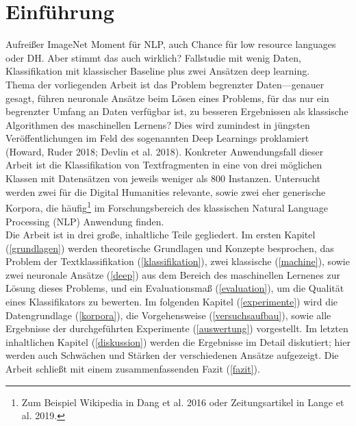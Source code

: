 \chapter{Einführung}
\label{einfuehrung}




Aufreißer
ImageNet Moment für NLP, auch Chance für low resource languages oder DH. Aber stimmt das auch wirklich? Fallstudie mit wenig Daten, Klassifikation mit klassischer Baseline plus zwei Ansätzen deep learning.\\


Thema der vorliegenden Arbeit ist das Problem begrenzter Daten---genauer gesagt, führen neuronale Ansätze beim Lösen eines Problems, für das nur ein begrenzter Umfang an Daten verfügbar ist, zu \hspace{0.4mm}b\hspace{0.4mm}e\hspace{0.4mm}s\hspace{0.4mm}s\hspace{0.4mm}e\hspace{0.4mm}r\hspace{0.4mm}e\hspace{0.4mm}n\hspace{0.4mm} Ergebnissen als klassische Algorithmen des maschinellen Lernens? Dies wird zumindest in jüngsten Veröffentlichungen im Feld des sogenannten Deep Learnings proklamiert (Howard, Ruder 2018; Devlin et al. 2018). Konkreter Anwendungsfall dieser Arbeit ist die Klassifikation von Textfragmenten in eine von drei möglichen Klassen mit Datensätzen von jeweils weniger als 800 Instanzen. Untersucht werden zwei für die Digital Humanities relevante, sowie zwei eher generische Korpora, die häufig\footnote{Zum Beispiel Wikipedia in Dang et al. 2016 oder Zeitungsartikel in Lange et al. 2019.} im Forschungsbereich des klassischen Natural Language Processing (NLP) Anwendung finden. \\

Die Arbeit ist in drei große, inhaltliche Teile gegliedert. Im ersten Kapitel (\ref{grundlagen}) werden theoretische Grundlagen und Konzepte besprochen, das Problem der Textklassifikation (\ref{klassifikation}), zwei klassische (\ref{machine}), sowie zwei neuronale Ansätze ({\ref{deep}}) aus dem Bereich des maschinellen Lernenes zur Lösung dieses Problems, und ein Evaluationsmaß (\ref{evaluation}), um die Qualität eines Klassifikators zu bewerten. Im folgenden Kapitel (\ref{experimente}) wird die Datengrundlage (\ref{korpora}), die Vorgehensweise (\ref{versuchsaufbau}), sowie alle Ergebnisse der durchgeführten Experimente (\ref{auswertung}) vorgestellt. Im letzten inhaltlichen Kapitel (\ref{diskussion}) werden die Ergebnisse im Detail diskutiert; hier werden auch Schwächen und Stärken der verschiedenen Ansätze aufgezeigt. Die Arbeit schließt mit einem zusammenfassenden Fazit (\ref{fazit}).


